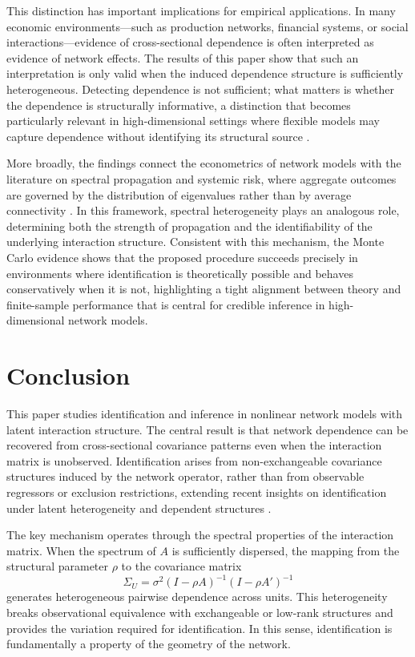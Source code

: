 \documentclass[12pt]{article}
\numberwithin{equation}{section}
\begin{document}
This distinction has important implications for empirical applications. In many economic environments—such as production networks, financial systems, or social interactions—evidence of cross-sectional dependence is often interpreted as evidence of network effects. The results of this paper show that such an interpretation is only valid when the induced dependence structure is sufficiently heterogeneous. Detecting dependence is not sufficient; what matters is whether the dependence is structurally informative, a distinction that becomes particularly relevant in high-dimensional settings where flexible models may capture dependence without identifying its structural source \citep{zhou2025neuralfrailty}.

More broadly, the findings connect the econometrics of network models with the literature on spectral propagation and systemic risk, where aggregate outcomes are governed by the distribution of eigenvalues rather than by average connectivity \citep{acemoglu2015systemic, elliott2014financial}. In this framework, spectral heterogeneity plays an analogous role, determining both the strength of propagation and the identifiability of the underlying interaction structure. Consistent with this mechanism, the Monte Carlo evidence shows that the proposed procedure succeeds precisely in environments where identification is theoretically possible and behaves conservatively when it is not, highlighting a tight alignment between theory and finite-sample performance that is central for credible inference in high-dimensional network models.

\section{Conclusion}

This paper studies identification and inference in nonlinear network models with latent interaction structure. The central result is that network dependence can be recovered from cross-sectional covariance patterns even when the interaction matrix is unobserved. Identification arises from non-exchangeable covariance structures induced by the network operator, rather than from observable regressors or exclusion restrictions, extending recent insights on identification under latent heterogeneity and dependent structures \citep{ghosh2024identifiability}.

The key mechanism operates through the spectral properties of the interaction matrix. When the spectrum of $A$ is sufficiently dispersed, the mapping from the structural parameter $\rho$ to the covariance matrix
\begin{equation}
\Sigma_U = \sigma^2 (I - \rho A)^{-1}(I - \rho A')^{-1}
\end{equation}
generates heterogeneous pairwise dependence across units. This heterogeneity breaks observational equivalence with exchangeable or low-rank structures and provides the variation required for identification. In this sense, identification is fundamentally a property of the geometry of the network.
\end{document}

